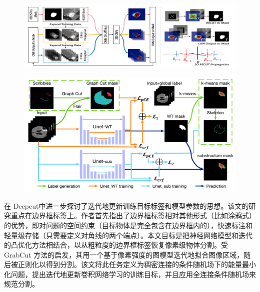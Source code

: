     \begin{figure}[tbp]
        \centering 
        \includegraphics[width=1.0\textwidth]{img/c2/rel_a4.png}
        \label{c2_fig4}
    \end{figure}


    \begin{figure}[tbp]
        \centering 
        \includegraphics[width=1.0\textwidth]{img/c2/rel_a5.png}
        \label{c2_fig5}
    \end{figure}


在 Deepcut\citep{rajchl2016deepcut}中进一步探讨了迭代地更新训练目标标签和模型参数的思想。该文的研究重点在边界框标签上。作者首先指出了边界框标签相对其他形式（比如涂鸦式）的优势，即对问题的空间约束（目标物体是完全包含在边界框内的），快速标注和轻量级存储（只需要定义对角线的两个端点）。本文目标是把神经网络模型和迭代的凸优化方法相结合，以从粗粒度的边界框标签恢复像素级物体分割。受 GrabCut 方法的启发，其用一个基于像素强度的图模型迭代地拟合图像区域，随后被正则化以得到分割。该文将此任务定义为稠密连接的条件随机场下的能量最小化问题，提出迭代地更新卷积网络学习的训练目标，并且应用全连接条件随机场来规范分割。

